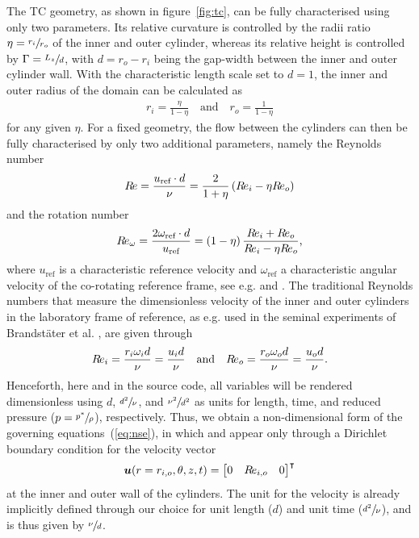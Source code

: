 \documentclass[a4paper, 11pt, DIV=11]{scrartcl}
\begin{document}
The TC geometry, as shown in figure~\ref{fig:tc}, can be fully characterised using
only two parameters. Its relative curvature is controlled by the radii ratio
$\eta=\sfrac{r_i}{r_o}$ of the inner and outer cylinder, whereas its relative height
is controlled by $\Gamma=\sfrac{L_z}{d}$, with $d=r_{o}-r_{i}$ being the gap-width
between the inner and outer cylinder wall. With the characteristic length scale set
to $d=1$, the inner and outer radius of the domain can be calculated as
\begin{align}
r_{i} = \frac{\eta}{1-\eta}
\quad\text{and}\quad
r_{o} = \frac{1}{1-\eta}
\end{align}
for any given $\eta$. For a fixed geometry, the flow between the cylinders can then
be fully characterised by only two additional parameters, namely the Reynolds number
\begin{align}
R\hspace{-0.1em}e = \frac{u_{\text{ref}}\cdot d}{\nu}
=\frac{2}{1+\eta}\left(R\hspace{-0.1em}e_{i}-\eta R\hspace{-0.1em}e_{o}\right)
\end{align}
and the rotation number
\begin{align}
R\hspace{-0.1em}e_{\omega} = \frac{2\omega_{\text{ref}}\cdot d}{u_{\text{ref}}} =
\left(1-\eta\right) \frac{R\hspace{-0.1em}e_{i}+R\hspace{-0.1em}e_{o}}{R\hspace{-0.1em}e_{i}-\eta R\hspace{-0.1em}e_{o}}
\text{,}
\end{align}
where $u_{\text{ref}}$ is a characteristic reference velocity and
$\omega_{\text{ref}}$ a characteristic angular velocity of the co-rotating reference
frame, see e.g. \cite{Dubrulle2005a} and \cite{Brauckmann2016}. The traditional Reynolds
numbers that measure the dimensionless velocity of the inner and outer cylinders in the
laboratory frame of reference, as e.g. used in the seminal experiments of Brandstäter
et al. \cite{Brandstater1983, Brandstater1987}, are given through
\begin{align}
R\hspace{-0.1em}e_{i} = \frac{r_{i}\omega_{i}d}{\nu} = \frac{u_{i}d}{\nu}
\hspace{1em}\text{and}\hspace{1em}
R\hspace{-0.1em}e_{o} = \frac{r_{o}\omega_{o}d}{\nu} = \frac{u_{o}d}{\nu}
\text{.}
\label{eq:reynoldsIO}
\end{align}
Henceforth, here and in the source code, all variables will be rendered dimensionless
using $d$, $\sfrac{d^2}{\nu}$, and $\sfrac{\nu^2}{d^2}$ as units for length, time,
and reduced pressure ($p=\sfrac{p^{\ast}}{\rho}$), respectively. Thus, we obtain a
non-dimensional form of the governing equations~(\ref{eq:nse}), in which \Rei and \Reo
appear only through a Dirichlet boundary condition for the velocity vector
\begin{align}
\boldsymbol{u}(r=r_{i,o}, \theta, z, t) =
\begin{bmatrix}
0 & R\hspace{-0.1em}e_{i,o} & 0 
\end{bmatrix}^{\intercal}
\label{eq:noslipBC}
\end{align}
at the inner and outer wall of the cylinders. The unit for the velocity is already
implicitly defined through our choice for unit length ($d$) and unit time
($\sfrac{d^2}{\nu}$), and is thus given by $\sfrac{\nu}{d}$.
\end{document}
